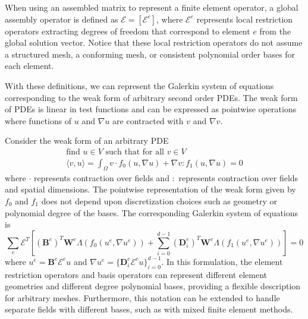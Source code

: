 When using an assembled matrix to represent a finite element operator, a global assembly operator is defined as $\mathcal{E} = \left[ \mathcal{E}^e \right]$, where $\mathcal{E}^e$ represents local restriction operators extracting degrees of freedom that correspond to element $e$ from the global solution vector.
Notice that these local restriction operators do not assume a structured mesh, a conforming mesh, or consistent polynomial order bases for each element.

With these definitions, we can represent the Galerkin system of equations corresponding to the weak form of arbitrary second order PDEs.
The weak form of PDEs is linear in test functions and can be expressed as pointwise operations where functions of $u$ and $\nabla u$ are contracted with $v$ and $\nabla v$.

Consider the weak form of an arbitrary PDE
\begin{equation}
\begin{array}{c}
\text{find } u \in V \text{ such that for all } v \in V\\
\langle v, u \rangle = \int_{\Omega} v \cdot f_0 \left( u, \nabla u \right) + \nabla v : f_1 \left( u, \nabla u \right) = 0
\end{array}
\label{weak_form}
\end{equation}
where $\cdot$ represents contraction over fields and $:$ represents contraction over fields and spatial dimensions.
The pointwise representation of the weak form given by $f_0$ and $f_1$ does not depend upon discretization choices such as geometry or polynomial degree of the bases.
The corresponding Galerkin system of equations is
\begin{equation}
\sum_e \mathcal{E}^T \left[ \left( \mathbf{B}^e \right)^T \mathbf{W}^e \Lambda \left( f_0 \left( u^e, \nabla u^e \right) \right) + \sum_{i = 0}^{d - 1} \left( \mathbf{D}_i^e \right)^T \mathbf{W}^e \Lambda \left( f_1 \left( u^e, \nabla u^e \right) \right) \right] = 0
\label{galerkin_form}
\end{equation}
where $u^e = \mathbf{B}^e \mathcal{E}^e u$ and $\nabla u^e = \lbrace \mathbf{D}_i^e \mathcal{E}^e u \rbrace_{i = 0}^{d - 1}$.
In this formulation, the element restriction operators and basis operators can represent different element geometries and different degree polynomial bases, providing a flexible description for arbitrary meshes.
Furthermore, this notation can be extended to handle separate fields with different bases, such as with mixed finite element methods.

